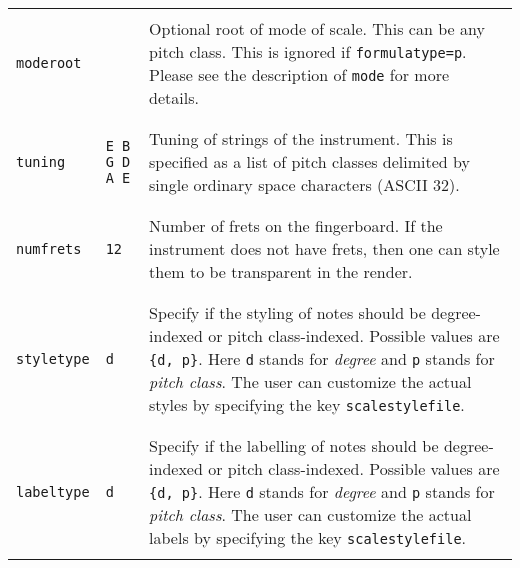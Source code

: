 \documentclass[12pt,letterpaper]{article}
\begin{document}
\begin{table}[H]
\begin{tabular}{|l|l|p{8cm}|}
\hline

&&\\
\texttt{moderoot} &  & Optional root of mode of scale. This can be any pitch class. This is ignored if \texttt{formulatype=p}. Please see the description of \texttt{mode} for more details.\\
&&\\

\hline

&&\\
\texttt{tuning} & \texttt{E B G D A E} & Tuning of strings of the instrument. This is specified as a list of pitch classes delimited by single ordinary space characters (ASCII 32).\\
&&\\

\hline

&&\\
\texttt{numfrets} & \texttt{12} & Number of frets on the fingerboard. If the instrument does not have frets, then one can style them to be transparent in the render.\\
&&\\

\hline

&&\\
\texttt{styletype} & \texttt{d} & Specify if the styling of notes should be degree-indexed or pitch class-indexed. Possible values are \texttt{\{d, p\}}. Here \texttt{d} stands for \textit{degree} and \texttt{p} stands for \textit{pitch class}. The user can customize the actual styles by specifying the key \texttt{scalestylefile}.\\
&&\\

\hline

&&\\
\texttt{labeltype} & \texttt{d} & Specify if the labelling of notes should be degree-indexed or pitch class-indexed. Possible values are \texttt{\{d, p\}}. Here \texttt{d} stands for \textit{degree} and \texttt{p} stands for \textit{pitch class}. The user can customize the actual labels by specifying the key \texttt{scalestylefile}.\\
&&\\

\hline


\end{tabular}
\end{table}
\end{document}
